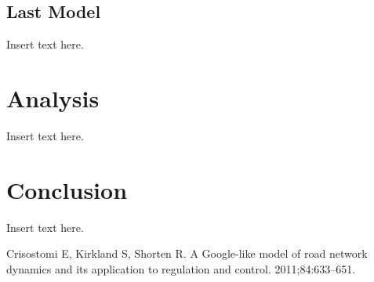 \documentclass[twoside,twocolumn]{article}
\begin{document}
\subsection{Last Model}
Insert text here.

\section{Analysis}
\label{sec:analysis}
Insert text here.

\section{Conclusion}
\label{sec:conclusion}
Insert text here.


\begin{thebibliography}{99} %

Crisostomi E, Kirkland S, Shorten R. 
\newblock A Google-like model of road network dynamics and its application to regulation and control.
 2011;84:633--651.
 
\end{thebibliography}

\end{document}
